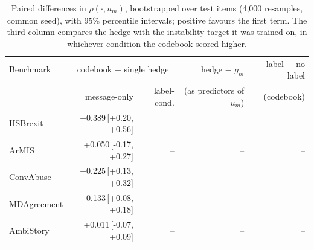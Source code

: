 \begin{table}[t]
\centering
\small
\begin{tabular}{lrrrr}
\hline
Benchmark & \multicolumn{2}{c}{codebook $-$ single hedge} & hedge $-$ $g_m$ & label $-$ no label \\
 & message-only & label-cond. & (as predictors of $u_m$) & (codebook) \\
\hline
HSBrexit & +0.389{\scriptsize\,[+0.20, +0.56]} & -- & -- & -- \\
ArMIS & +0.050{\scriptsize\,[-0.17, +0.27]} & -- & -- & -- \\
ConvAbuse & +0.225{\scriptsize\,[+0.13, +0.32]} & -- & -- & -- \\
MDAgreement & +0.133{\scriptsize\,[+0.08, +0.18]} & -- & -- & -- \\
AmbiStory & +0.011{\scriptsize\,[-0.07, +0.09]} & -- & -- & -- \\
\hline
\end{tabular}
\caption{Paired differences in $\rho(\cdot,u_m)$, bootstrapped over test items (4,000 resamples, common seed), with 95\% percentile intervals; positive favours the first term. The third column compares the hedge with the instability target it was trained on, in whichever condition the codebook scored higher.}
\label{tab:paired}
\end{table}